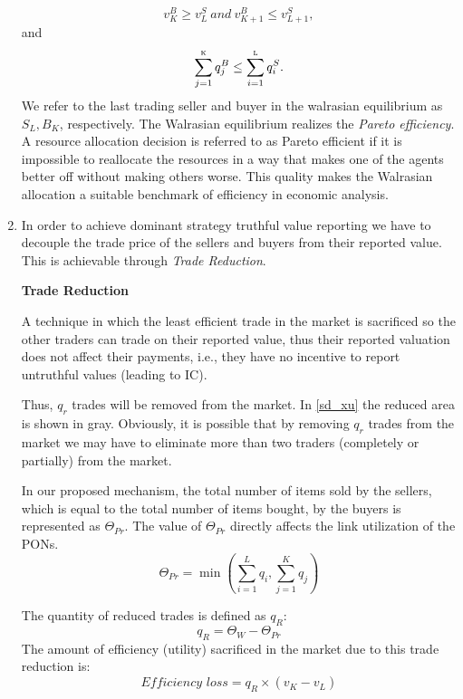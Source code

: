 \begin{enumerate}
\begin{equation}
v^{B}_K\geq v^{S}_L \ \textit{and} \ v^{B}_{K+1} \leq v^{S}_{L+1},
\end{equation}
\vspace{-1mm}
and
\vspace{-1mm}
\begin{equation}
\sum_{j=1}^\textsc{k} q_{j}^B \leq \sum_{i=1}^\textsc{l} q_{i}^S.
\end{equation}
We refer to the last trading seller and buyer in the walrasian equilibrium as $S_L , B_K$, respectively.
The Walrasian equilibrium realizes the \textit{Pareto efficiency}. A resource allocation decision is referred to as Pareto efficient if it is impossible to reallocate the resources in a way that makes one of the agents better off without making others worse. This quality makes the Walrasian allocation a suitable benchmark of efficiency in economic analysis.


\item In order to achieve dominant strategy truthful value reporting we have to decouple the trade price of the sellers and buyers from their reported value. This is achievable through \textit{Trade Reduction}.

\begin{Definition}
\textbf{Trade Reduction}

A technique in which the least efficient trade in the market is sacrificed so the other traders can trade on their reported value, thus their reported valuation does not affect their payments, i.e., they have no incentive to report untruthful values (leading to \ac{IC}).
\end{Definition}
Thus, $q_{r}$ trades will be removed from the market. In \autoref{sd_xu} the reduced area is shown in gray. Obviously, it is possible that by removing $q_{r}$ trades from the market we may have to eliminate more than two traders (completely or partially) from the market.

In our proposed mechanism, the total number of items sold by the sellers, which is equal to the total number of items bought, by the buyers is represented as $\Theta^{}_{Pr}$. The value of $\Theta^{}_{Pr}$ directly affects the link utilization of the \acp{PON}.
\vspace{-2mm}
\begin{equation}
\Theta^{}_{Pr} = \min (\sum_{i=1}^{L}{q_{i}}, \sum_{j=1}^{K}{q_{j}})
\end{equation}

The quantity of reduced trades is defined as $q^{}_R$:
\begin{equation}
q^{}_R = \Theta^{}_W - \Theta^{}_{Pr}
\end{equation}
The amount of efficiency (utility) sacrificed in the market due to this trade reduction is:
\begin{equation}
\textit{Efficiency loss} = q^{}_R \times (v^{}_K-v^{}_L)
\end{equation}


\end{enumerate}
